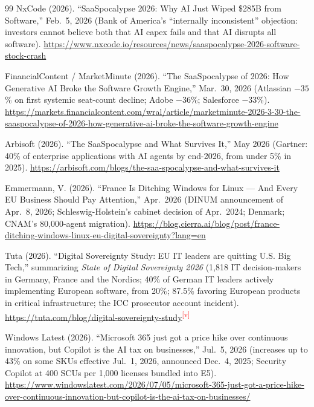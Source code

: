 \documentclass[11pt,letterpaper]{article}
\newcommand{\verify}{\textsuperscript{\textcolor{red}{[v]}}}
\begin{document}
\begin{thebibliography}{99}
NxCode (2026). ``SaaSpocalypse 2026: Why AI Just Wiped \$285B from Software,'' Feb.~5, 2026 (Bank of America's ``internally inconsistent'' objection: investors cannot believe both that AI capex fails and that AI disrupts all software). \url{https://www.nxcode.io/resources/news/saaspocalypse-2026-software-stock-crash}

FinancialContent / MarketMinute (2026). ``The SaaSpocalypse of 2026: How Generative AI Broke the Software Growth Engine,'' Mar.~30, 2026 (Atlassian $-35$\% on first systemic seat-count decline; Adobe $-36$\%; Salesforce $-33$\%). \url{https://markets.financialcontent.com/wral/article/marketminute-2026-3-30-the-saaspocalypse-of-2026-how-generative-ai-broke-the-software-growth-engine}

Arbisoft (2026). ``The SaaSpocalypse and What Survives It,'' May 2026 (Gartner: 40\% of enterprise applications with AI agents by end-2026, from under 5\% in 2025). \url{https://arbisoft.com/blogs/the-saa-spocalypse-and-what-survives-it}

Emmermann, V. (2026). ``France Is Ditching Windows for Linux --- And Every EU Business Should Pay Attention,'' Apr.~2026 (DINUM announcement of Apr.~8, 2026; Schleswig-Holstein's cabinet decision of Apr.~2024; Denmark; CNAM's 80,000-agent migration). \url{https://blog.cierra.ai/blog/post/france-ditching-windows-linux-eu-digital-sovereignty?lang=en}

Tuta (2026). ``Digital Sovereignty Study: EU IT leaders are quitting U.S. Big Tech,'' summarizing \textit{State of Digital Sovereignty 2026} (1,818 IT decision-makers in Germany, France and the Nordics; 40\% of German IT leaders actively implementing European software, from 20\%; 87.5\% favoring European products in critical infrastructure; the ICC prosecutor account incident). \url{https://tuta.com/blog/digital-sovereignty-study}\verify

Windows Latest (2026). ``Microsoft 365 just got a price hike over continuous innovation, but Copilot is the AI tax on businesses,'' Jul.~5, 2026 (increases up to 43\% on some SKUs effective Jul.~1, 2026, announced Dec.~4, 2025; Security Copilot at 400 SCUs per 1,000 licenses bundled into E5). \url{https://www.windowslatest.com/2026/07/05/microsoft-365-just-got-a-price-hike-over-continuous-innovation-but-copilot-is-the-ai-tax-on-businesses/}


\end{thebibliography}
\end{document}
